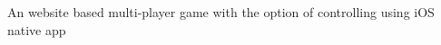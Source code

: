 \begin{cventry}
  \item An website based multi-player game with the option of controlling using iOS native app
\end{cventry}
